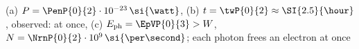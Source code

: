 (a) $P = \PenP{0}{2}\cdot 10^{-23}\,\si{\watt}$, (b) $t = \twP{0}{2} \approx \SI{2.5}{\hour}$, observed: at once, (c) $E_\mathrm{ph} = \EpVP{0}{3} > W$, $N = \NrnP{0}{2}\cdot 10^{9}\,\si{\per\second}$; each photon frees an electron at once
